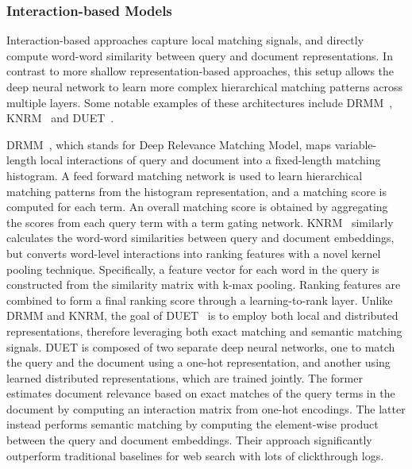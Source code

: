 \subsubsection{Interaction-based Models}

Interaction-based approaches capture local matching signals, and directly compute word-word similarity between query and document representations.
In contrast to more shallow representation-based approaches, this setup allows the deep neural network to learn more complex hierarchical matching patterns across multiple layers.
Some notable examples of these architectures include DRMM~\cite{guo2017drmm}, KNRM~\cite{xiong2017knrm} and DUET~\cite{mitra2017learning}.

DRMM~\cite{guo2017drmm}, which stands for Deep Relevance Matching Model, maps variable-length local interactions of query and document into a fixed-length matching histogram.
A feed forward matching network is used to learn hierarchical matching patterns from the histogram representation, and a matching score is computed for each term.
An overall matching score is obtained by aggregating the scores from each query term with a term gating network.
KNRM~\cite{xiong2017knrm} similarly calculates the word-word similarities between query and document embeddings, but converts word-level interactions into ranking features with a novel kernel pooling technique.
Specifically, a feature vector for each word in the query is constructed from the similarity matrix with k-max pooling.
Ranking features are combined to form a final ranking score through a learning-to-rank layer.
Unlike DRMM and KNRM, the goal of DUET~\cite{mitra2017learning} is to employ both local and distributed representations, therefore leveraging both exact matching and semantic matching signals.
DUET is composed of two separate deep neural networks, one to match the query and the document using a one-hot representation, and another using learned distributed representations, which are trained jointly.
The former estimates document relevance based on exact matches of the query terms in the document by computing an interaction matrix from one-hot encodings.
The latter instead performs semantic matching by computing the element-wise product between the query and document embeddings.
Their approach significantly outperform traditional baselines for web search with lots of clickthrough logs.

